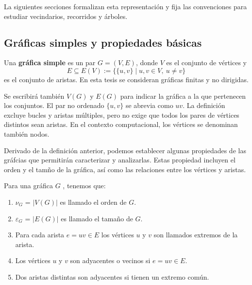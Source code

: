 La siguientes secciones formalizan esta representación y fija las convenciones para estudiar vecindarios, recorridos y árboles.

\subsection{Gráficas simples y propiedades básicas}

\begin{definition} 
\label{def:grafica-simple}
Una \textbf{gráfica simple} es un par $G=(V,E)$, donde $V$ es el conjunto de vértices y
\[
E\subseteq E(V):=\{\{u,v\}\mid u,v\in V,\ u\neq v\}
\]
es el conjunto de aristas. En esta tesis se consideran gráficas finitas y no dirigidas.
\end{definition}

Se escribirá también $V(G)$ y $E(G)$ para indicar la gráfica a la que pertenecen los conjuntos. El par no ordenado $\{u,v\}$ se abrevia como $uv$. La definición excluye bucles y aristas múltiples, pero no exige que todos los pares de vértices distintos sean aristas. En el contexto computacional, los vértices se denominan también nodos.

Derivado de la definición anterior, podemos establecer algunas propiedades de las gráfcias que permitirán caracterizar y analizarlas. Estas propiedad incluyen el orden y el tamño de la gráfica, así como las relaciones entre los vértices y aristas.

\begin{definition} 
\label{def:orden-tamano-adyacencia}
Para una gráfica $G$ , tenemos que:
\begin{enumerate}
    \item $\nu_{G}$ = $|V(G)|$ es llamado el orden de $G$.
    \item $\varepsilon_{G}$ = $|E(G)|$ es llamado  el tamaño de $G$.
    \item Para cada arista $e = uv \in E$ los vértices $u$ y $v$ son llamados extremos de la arista.
    \item Los vértices $u$ y $v$ son adyacentes o vecinos si $e = uv \in E$.
    \item Dos aristas distintas son adyacentes si tienen un extremo común.
\end{enumerate}
\end{definition}

